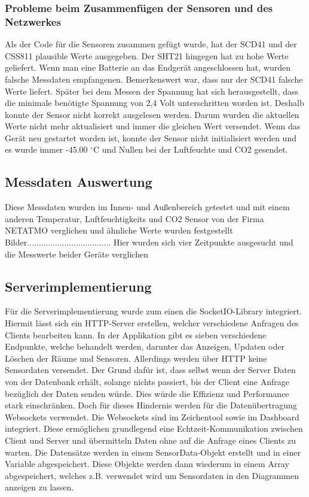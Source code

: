 \documentclass[]{article}
\begin{document}
			 
			\subsubsection{Probleme beim Zusammenfügen der Sensoren und des Netzwerkes}
			Als der Code für die Sensoren zusammen gefügt wurde, hat der SCD41 und der CSS811 plausible Werte ausgegeben. Der SHT21 hingegen hat zu hohe Werte geliefert. Wenn man eine Batterie an das Endgerät angeschlossen hat, wurden falsche Messdaten empfangenen. Bemerkenswert war, dass nur der SCD41 falsche Werte liefert. Später bei dem Messen der Spannung hat sich herausgestellt, dass die minimale benötigte Spannung von 2,4 Volt unterschritten worden ist. Deshalb konnte der Sensor nicht korrekt ausgelesen werden. Darum wurden die aktuellen Werte nicht mehr aktualisiert und immer die gleichen Wert versendet. Wenn das Gerät neu gestartet worden ist, konnte der Sensor nicht initialisiert werden und es wurde immer -45.00 $^\circ$C und Nullen bei der Luftfeuchte und CO2 gesendet.
			
			
			\subsection{Messdaten Auswertung}
			Diese Messdaten wurden im Innen- und Außenbereich getestet und mit einem anderen Temperatur, Luftfeuchtigkeits und CO2 Sensor von der Firma NETATMO verglichen und ähnliche Werte wurden festgestellt Bilder....................................
			Hier wurden sich vier Zeitpunkte ausgesucht und die Messwerte beider Geräte verglichen
			
			
					
			\subsection{Serverimplementierung}
				Für die Serverimplementierung wurde zum einen die SocketIO-Library integriert. Hiermit lässt sich ein HTTP-Server erstellen, welcher verschiedene Anfragen des Clients bearbeiten kann. In der Applikation gibt es sieben verschiedene Endpunkte, welche behandelt werden, darunter das Anzeigen, Updaten oder Löschen der Räume und Sensoren. Allerdings werden über HTTP keine Sensordaten versendet. Der Grund dafür ist, dass selbst wenn der Server Daten von der Datenbank erhält, solange nichts passiert, bis der Client eine Anfrage bezüglich der Daten senden würde. Dies würde die Effizienz und Performance stark einschränken. \newline 
				Doch für dieses Hindernis werden für die Datenübertragung Websockets verwendet. Die Websockets sind im Zeichentool sowie im Dashboard integriert. Diese ermöglichen grundlegend eine Echtzeit-Kommunikation zwischen Client und Server und übermitteln Daten ohne auf die Anfrage eines Clients zu warten. Die Datensätze werden in einem SensorData-Objekt erstellt und in einer Variable abgespeichert. Diese Objekte werden dann wiederum in einem Array abgespeichert, welches z.B. verwendet wird um Sensordaten in den Diagrammen anzeigen zu lassen. 
				
\end{document}
